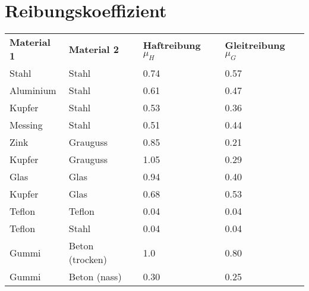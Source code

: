 



\section{Reibungskoeffizient}
\begin{footnotesize}
\begin{longtable}{llll}
  \rowcolor{white} \textbf{Material 1} & \textbf{Material 2} 
  & \textbf{Haftreibung $\mu_H$} & \textbf{Gleitreibung $\mu_G$}\\
  \rowcolor{lgray}  Stahl     & Stahl             & 0.74 & 0.57\\
  \rowcolor{white}  Aluminium & Stahl             & 0.61 & 0.47\\
  \rowcolor{lgray}  Kupfer    & Stahl             & 0.53 & 0.36\\
  \rowcolor{white}  Messing   & Stahl             & 0.51 & 0.44\\
  \rowcolor{lgray}  Zink      & Grauguss          & 0.85 & 0.21\\
  \rowcolor{white}  Kupfer    & Grauguss          & 1.05 & 0.29\\
  \rowcolor{lgray}  Glas      & Glas              & 0.94 & 0.40\\
  \rowcolor{white}  Kupfer    & Glas              & 0.68 & 0.53\\
  \rowcolor{lgray}  Teflon    & Teflon            & 0.04 & 0.04\\
  \rowcolor{white}  Teflon    & Stahl             & 0.04 & 0.04\\
  \rowcolor{lgray}  Gummi     & Beton (trocken)   & 1.0  & 0.80\\
  \rowcolor{white}  Gummi     & Beton (nass)      & 0.30 & 0.25
\end{longtable}
\end{footnotesize}